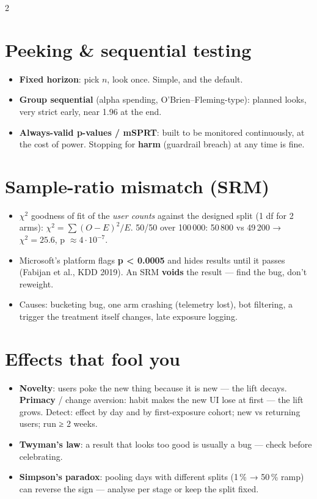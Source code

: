 \documentclass[8pt]{extarticle}
\begin{document}
\begin{multicols}{2}
\section{Peeking \& sequential testing}
\begin{itemize}
  \item \textbf{Fixed horizon}: pick $n$, look once. Simple, and the default.
  \item \textbf{Group sequential} (alpha spending, O'Brien–Fleming-type): planned looks,
        very strict early, near 1.96 at the end.
  \item \textbf{Always-valid p-values / mSPRT}: built to be monitored continuously, at the cost of power.
        Stopping for \textbf{harm} (guardrail breach) at any time is fine.
\end{itemize}

\section{Sample-ratio mismatch (SRM)}
\begin{itemize}
  \item $\chi^2$ goodness of fit of the \emph{user counts} against the designed split (1 df for 2 arms):
        $\chi^2 = \sum (O-E)^2/E$. 50/50 over 100\,000: 50\,800 vs 49\,200 → $\chi^2 = 25.6$, p $\approx 4\cdot10^{-7}$.
  \item Microsoft's platform flags \textbf{p < 0.0005} and hides results until it passes
        (Fabijan et al., KDD 2019). An SRM \textbf{voids} the result — find the bug, don't reweight.
  \item Causes: bucketing bug, one arm crashing (telemetry lost), bot filtering, a trigger the
        treatment itself changes, late exposure logging.
\end{itemize}

\columnbreak

\section{Effects that fool you}
\begin{itemize}
  \item \textbf{Novelty}: users poke the new thing because it is new — the lift decays.
        \textbf{Primacy} / change aversion: habit makes the new UI lose at first — the lift grows.
        Detect: effect by day and by first-exposure cohort; new vs returning users; run ≥ 2 weeks.
  \item \textbf{Twyman's law}: a result that looks too good is usually a bug — check before celebrating.
  \item \textbf{Simpson's paradox}: pooling days with different splits (1\,\% → 50\,\% ramp) can
        reverse the sign — analyse per stage or keep the split fixed.
\end{itemize}


\end{multicols}
\end{document}
